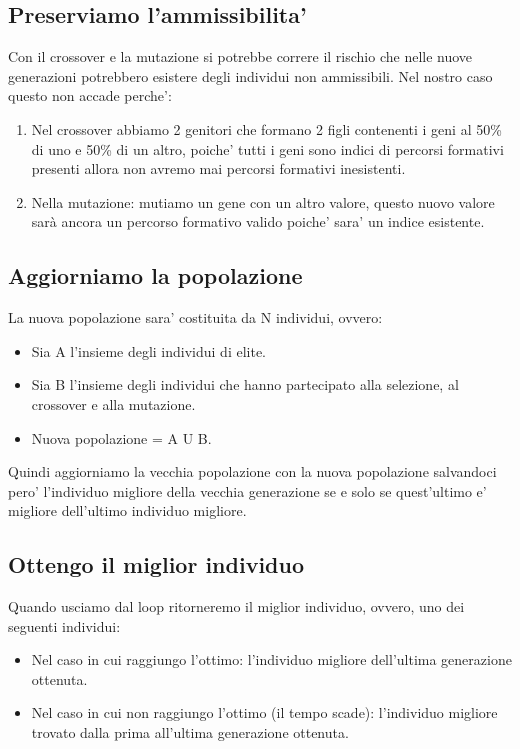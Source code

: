 \documentclass[10pt,a4paper]{article}
\begin{document}
    \subsection{Preserviamo l'ammissibilita'}
    \label{PreserviamoAmmissibilitaSubsection}
    Con il crossover e la mutazione si potrebbe correre il rischio che nelle nuove generazioni 
    potrebbero esistere degli individui non ammissibili. Nel nostro caso questo non accade perche':
    \begin{enumerate}
      \item Nel crossover abbiamo 2 genitori che formano 2 figli contenenti i geni 
      al 50\% di uno e 50\% di un altro, poiche' tutti i geni sono indici di percorsi formativi 
      presenti allora non avremo mai percorsi formativi inesistenti.
      \item Nella mutazione: mutiamo un gene con un altro valore, questo nuovo valore sarà ancora un 
      percorso formativo valido poiche' sara' un indice esistente.
    \end{enumerate}
    
    \subsection{Aggiorniamo la popolazione}
    \label{aggiorniamoPopolazioneSubsection}
    La nuova popolazione sara' costituita da N individui, ovvero:
    \begin{itemize}
      \item Sia A l'insieme degli individui di elite.
      \item Sia B l'insieme degli individui che hanno partecipato alla selezione, al crossover e alla 
      mutazione.
      \item Nuova popolazione = A U B.
    \end{itemize}
    Quindi aggiorniamo la vecchia popolazione con la nuova popolazione salvandoci pero' l'individuo 
    migliore della vecchia generazione se e solo se quest'ultimo e' migliore dell'ultimo individuo 
    migliore.
    
    \subsection{Ottengo il miglior individuo}
    \label{ottengoMigliorIndividuoSubsection}
    Quando usciamo dal loop ritorneremo il miglior individuo, ovvero, uno dei seguenti individui:
    \begin{itemize}
      \item Nel caso in cui raggiungo l'ottimo: l'individuo migliore dell'ultima generazione ottenuta.
      \item Nel caso in cui non raggiungo l'ottimo (il tempo scade): l'individuo migliore trovato dalla 
      prima all'ultima generazione ottenuta.
    \end{itemize}
    
\end{document}
